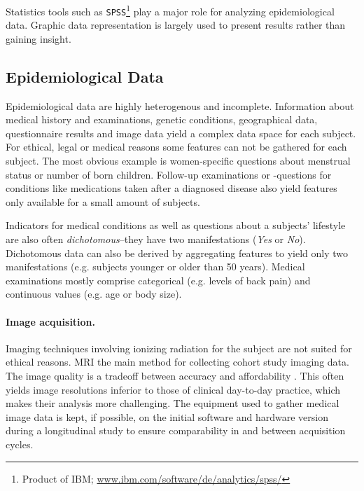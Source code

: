 \documentclass[journal]{style/vgtc} 			          %
\begin{document}
Statistics tools such as \texttt{SPSS}\footnote{Product of IBM; \url{www.ibm.com/software/de/analytics/spss/}} play a major role for analyzing epidemiological data.
%
Graphic data representation is largely used to present results rather than gaining insight.
	
\subsection{Epidemiological Data} \label{EpidemiologicalData}
Epidemiological data are highly heterogenous and incomplete.
%
Information about medical history and examinations, genetic conditions, geographical data, questionnaire results and image data yield a complex data space for each subject.
%
%
For ethical, legal or medical reasons some features can not be gathered for each subject.
%
The most obvious example is women-specific questions about menstrual status or number of born children.
%
Follow-up examinations or -questions for conditions like medications taken after a diagnosed disease also yield features only available for a small amount of subjects.
%

Indicators for medical conditions as well as questions about a subjects' lifestyle are also often \emph{dichotomous}--they have two manifestations (\emph{Yes} or \emph{No}).
%
%
Dichotomous data can also be derived by aggregating features to yield only two manifestations (e.g. subjects younger or older than 50 years).
%
Medical examinations mostly comprise categorical (e.g. levels of back pain) and continuous values (e.g. age or body size).

\paragraph{Image acquisition.} \label{ImageAcquisition} Imaging techniques involving ionizing radiation for the subject are not suited for ethical reasons.
%
MRI the main method for collecting cohort study imaging data.
%
The image quality is a tradeoff between accuracy and affordability \cite{Preim2014}.
%
This often yields image resolutions inferior to those of clinical day-to-day practice, which makes their analysis more challenging.
The equipment used to gather medical image data is kept, if possible, on the initial software and hardware version during a longitudinal study to ensure comparability in and between acquisition cycles.
\end{document}
